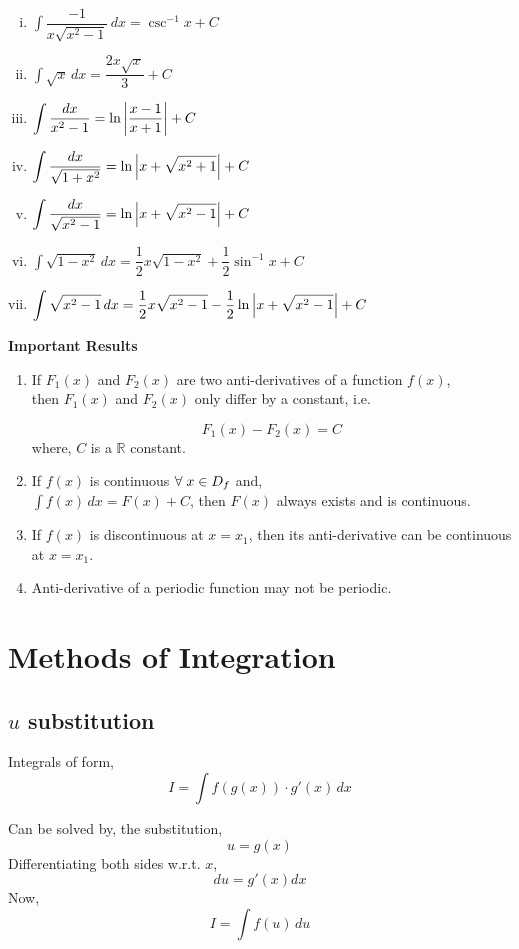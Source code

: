 \documentclass{article}
\begin{document}
\begin{enumerate}[i.]
    \item $\displaystyle\int \dfrac{-1}{x\displaystyle\sqrt{x^2-1}} \, dx=\csc^{-1}x+C$
    \item $\displaystyle\int \sqrt{x} \, dx=\dfrac{2x\sqrt{x}}{3}+C$
    \item $\displaystyle\int \dfrac{dx}{x^2-1}=\ln \abs{\dfrac{x-1}{x+1}}+C $
    \item $\displaystyle\int \dfrac{dx}{\sqrt{1+x^2}}=\ln \abs{x+\sqrt{x^2+1}}+C$
    \item $\displaystyle\int \dfrac{dx}{\sqrt{x^2-1}}=\ln \abs{x+\sqrt{x^2-1}}+C$
    \item $\displaystyle\int \sqrt{1-x^2} \, dx=\dfrac{1}{2}x\sqrt{1-x^2}+\dfrac{1}{2} \sin^{-1} x +C $
    \item $\displaystyle\int \sqrt{x^2-1} \, dx= \dfrac{1}{2}x\sqrt{x^2-1}-\dfrac{1}{2}\ln \abs{x+\sqrt{x^2-1}}+C $

\end{enumerate}
\textbf{Important Results}
\begin{enumerate}
    \item If $F_{1}(x)$ and $F_{2}(x)$ are two anti-derivatives of a function $f(x)$, \\then $F_{1}(x) $ and $F_{2}(x) $ only differ by a constant, i.e.

          $$F_{1}(x) - F_{2}(x)=C$$
          where, $C$ is a $\mathbb{R}$ constant.
    \item If $f(x)$ is continuous $\forall \hspace{1mm} x \in D_{f}$ and,\\
          $\displaystyle\int f(x) \, dx=F(x)+C$, then $F(x)$ always exists and is continuous.
    \item If $f(x)$ is discontinuous at $x=x_{1}$, then its anti-derivative can be continuous at $x=x_{1}$.
    \item Anti-derivative of a periodic function may not be periodic.
\end{enumerate}

\section{Methods of Integration}
\subsection{$u$ substitution}
Integrals of form, $$I=\int f(g(x))\cdot g'(x) \, dx$$

Can be solved by, the substitution,
$$u=g(x)$$ Differentiating both sides w.r.t. $x$,
$$du=g'(x)dx$$
Now, $$I=\int f(u) \, du$$
\end{document}

